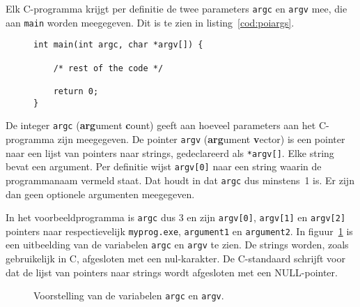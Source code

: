 Elk C-programma krijgt per definitie de twee parameters \texttt{argc} en \texttt{argv} mee, die aan \texttt{main} worden meegegeven. Dit is te zien in listing~\ref{cod:poiargs}.

\begin{figure}[!ht]
\begin{lstlisting}[caption=Declaratie van de command line parameters.,label=cod:poiargs]
int main(int argc, char *argv[]) {

    /* rest of the code */
    
    return 0;
}
\end{lstlisting}
\end{figure}

De integer \texttt{argc} (\textbf{arg}ument \textbf{c}ount) geeft aan hoeveel parameters aan het C-programma zijn meegegeven. De pointer \texttt{argv} (\textbf{arg}ument \textbf{v}ector) is  een pointer naar een lijst van pointers naar strings, gedeclareerd als \texttt{*argv[]}. Elke string bevat een argument. Per definitie wijst \texttt{argv[0]} naar een string waarin de programmanaam vermeld staat. Dat houdt in dat \texttt{argc} dus minstens~1 is. Er zijn dan geen optionele argumenten meegegeven.

In het voorbeeldprogramma is \texttt{argc} dus 3 en zijn \texttt{argv[0]}, \texttt{argv[1]} en \texttt{argv[2]} pointers naar respectievelijk \texttt{myprog.exe}, \texttt{argument1} en \texttt{argument2}. In figuur~\ref{fig:poiargcargv} is een uitbeelding van de variabelen \texttt{argc} en \texttt{argv} te zien. De strings worden, zoals gebruikelijk in C,  afgesloten met een nul-karakter. De C-standaard schrijft voor dat de lijst van pointers naar strings wordt afgesloten met een NULL-pointer.

\begin{figure}[!ht]
\centering
{}
\caption{Voorstelling van de variabelen \texttt{argc} en \texttt{argv}.}
\label{fig:poiargcargv}
\end{figure}

